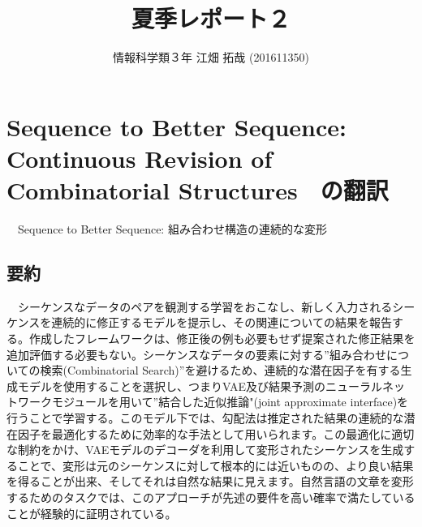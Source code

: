 \documentclass{scrartcl}
\author{情報科学類３年 江畑 拓哉 (201611350)}
\date{}
\title{夏季レポート２}
\begin{document}
\maketitle

\section{Sequence to Better Sequence: Continuous Revision of Combinatorial Structures　の翻訳}
\label{sec:orgf889f15}
　Sequence to Better Sequence: 組み合わせ構造の連続的な変形\\
\subsection{要約}
\label{sec:org287e31c}
　シーケンスなデータのペアを観測する学習をおこなし、新しく入力されるシーケンスを連続的に修正するモデルを提示し、その関連についての結果を報告する。作成したフレームワークは、修正後の例も必要もせず提案された修正結果を追加評価する必要もない。シーケンスなデータの要素に対する”組み合わせについての検索(Combinatorial Search)”を避けるため、連続的な潜在因子を有する生成モデルを使用することを選択し、つまりVAE及び結果予測のニューラルネットワークモジュールを用いて”結合した近似推論"(joint approximate interface)を行うことで学習する。このモデル下では、勾配法は推定された結果の連続的な潜在因子を最適化するために効率的な手法として用いられます。この最適化に適切な制約をかけ、VAEモデルのデコーダを利用して変形されたシーケンスを生成することで、変形は元のシーケンスに対して根本的には近いものの、より良い結果を得ることが出来、そしてそれは自然な結果に見えます。自然言語の文章を変形するためのタスクでは、このアプローチが先述の要件を高い確率で満たしていることが経験的に証明されている。\\
\end{document}
